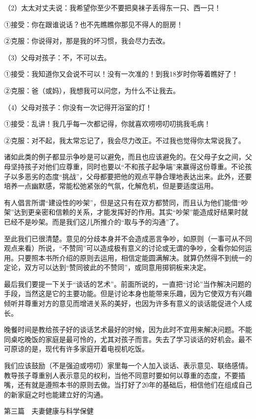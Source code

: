 \documentclass[12pt,UTF8]{ctexbook}
\begin{document}
（2）太太对丈夫说：我希望你至少不要把臭袜子丢得东一只、西一只！

①接受：你在跟谁说话？也不先瞧瞧你那见不得人的厨房！

②克服：你说得对，那是我的坏习惯，我会尽力去改。

（3）父母对孩子：不，不可以去。

①接受：我知道你又会说不可以！没有一次准的！到我18岁时你等着瞧好了！

②克服：爸（或妈），我想我可以问您，为什么不让我去。

（4）父母对孩子：你没有一次记得开浴室的灯！

①接受：乱讲！我几乎每一次都记得，你就喜欢唠唠叨叨挑我毛病！

②克服：对不起，我太常忘记了，我会尽力改正。不过我也觉得你太常说我了。

诸如此类的例子都显示争吵是可以避免，而且也应该避免的。在父母子女之间，父母坚持孩子对他们应尊重，同时也要以“不和孩子起争端”来赢得这份尊重。不论孩子以多恶劣的态度“挑战”，父母都要把他的观点平静合理地表达出来。此外，还要培养一点幽默感，常能松弛紧张的气氛，化解危机，但是要适度运用。

有人倡言所谓“建设性的吵架”，但是这只有在双方都赞同，而且认为他们能借“吵架”达到更亲密和信赖的关系，才能发挥好的作用。其实“吵架”能造成好结果时就已经不是吵架。而是我们这儿所推介的“取与予的沟通”了。

至此我们已很清楚。意见的分歧本身并不会造成恶言争吵，如原则（一事可从不同观点来看）所说，“不赞同”可以造成极有意义的讨论或无谓的争吵，全看你如何运用。只要照本书所介绍的原则去运用，相信定能圆满解决。就算仍然得不到统一的定论，双方可以达到“赞同彼此的不赞同”，或同意用掷铜板来决定。

最后我们要提一下关于“谈话的艺术”。前面所说的，一直把“讨论”当作解决问题的手段，当然这是它的主要功能。但是讨论本身也能带来乐趣，因为它使双方有兴趣倾听并尊重对方的意见而增进关系的美好，也因为许多有意义的谈话能促进个人成长。

晚餐时间是教给孩子好的谈话艺术最好的时候，因为此时不宜用来解决问题。不能同桌吃晚饭的家庭是最可怜的，尤其对孩子而言。失去了学习谈话的好机会。最不可原谅的是，现代有许多家庭开着电视机吃饭。

我们应该鼓励（不是强迫或唠叨）家里每一个人加入谈话、表示意见、联络感情。教导孩子尊重别人表示意见的权利，当他不同意时要如何以尊重的态度，不要插嘴，还有就是遵照本书的原则去做。当打好了20年的基础后，相信他们在组成自己的新家庭之时也能建立好的沟通。





第三篇　夫妻健康与科学保健
\end{document}
